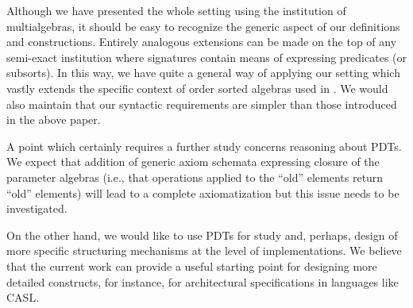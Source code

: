Although we have presented the whole setting using the institution of multialgebras, it should
be easy to recognize the generic aspect of our definitions and
constructions. Entirely analogous extensions can be made on the top of any
semi-exact institution where signatures contain means of expressing predicates (or
subsorts). In this way, we have quite a general way of applying our setting
which vastly extends the specific context of order sorted algebras used in
\cite{paramPoigne}. We would also maintain that our syntactic requirements
are simpler than those introduced in the above paper.

A point which certainly requires a further study concerns reasoning about
PDTs. We expect that addition of generic axiom schemata expressing closure of the
parameter algebras (i.e., that operations applied to the ``old'' elements
return ``old'' elements) will lead to a complete axiomatization but this issue
needs to be investigated.

On the other hand, we would like to use PDTs for study and, perhaps, design
of more specific structuring mechanisms at the level of implementations.
We believe that the current work can provide a useful starting point for designing more
detailed constructs, for instance, for architectural specifications in languages like CASL.









